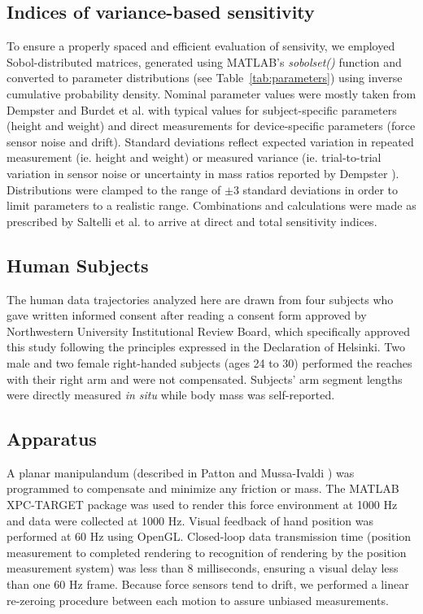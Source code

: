 \subsection*{Indices of variance-based sensitivity}
To ensure a properly spaced and efficient evaluation of sensivity, we employed Sobol-distributed matrices, generated using MATLAB's \textit{sobolset()} function and converted to parameter distributions (see Table~\ref{tab:parameters}) using inverse cumulative probability density. Nominal parameter values were mostly taken from Dempster \cite{dempster1955space} and Burdet et al. \cite{burdet2006stability} with typical values for subject-specific parameters (height and weight) and direct measurements for device-specific parameters (force sensor noise and drift). Standard deviations reflect expected variation in repeated measurement (ie. height and weight) or measured variance (ie. trial-to-trial variation in sensor noise or uncertainty in mass ratios reported by Dempster \cite{dempster1955space}). Distributions were clamped to the range of $\pm3$ standard deviations in order to limit parameters to a realistic range. Combinations and calculations were made as prescribed by Saltelli et al. \cite{saltelli2010variance} to arrive at direct and total sensitivity indices.

\subsection*{Human Subjects}
The human data trajectories analyzed here are drawn from four subjects who gave written informed consent after reading a consent form approved by Northwestern University Institutional Review Board, which specifically approved this study following the principles expressed in the Declaration of Helsinki. Two male and two female right-handed subjects (ages 24 to 30) performed the reaches with their right arm and were not compensated. Subjects' arm segment lengths were directly measured \textit{in situ} while body mass was self-reported. 

\subsection*{Apparatus}
A planar manipulandum (described in Patton and Mussa-Ivaldi \cite{patton2004robot}) was programmed to compensate and minimize any friction or mass. The MATLAB XPC-TARGET package \cite{MATLAB:2008} was used to render this force environment at 1000 Hz and data were collected at 1000 Hz.  Visual feedback of hand position was performed at 60 Hz using OpenGL. Closed-loop data transmission time (position measurement to completed rendering to recognition of rendering by the position measurement system) was less than 8 milliseconds, ensuring a visual delay less than one 60 Hz frame. Because force sensors tend to drift, we performed a linear re-zeroing procedure between each motion to assure unbiased measurements. 


